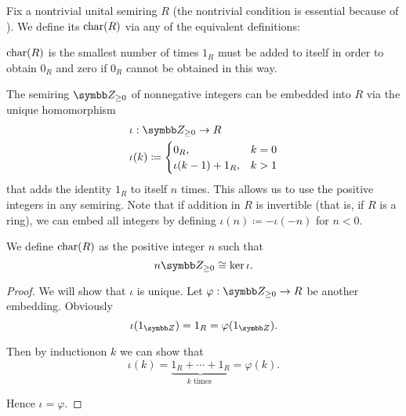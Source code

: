 \begin{definition}\label{def:semiring_characteristic}
  Fix a nontrivial unital semiring \( R \) (the nontrivial condition is essential because of ). We define its  \( \operatorname{char}(R) \) via any of the equivalent definitions:
  \begin{defenum}
     \( \operatorname{char}(R) \) is the smallest number of times \( 1_R \) must be added to itself in order to obtain \( 0_R \) and zero if \( 0_R \) cannot be obtained in this way.

     The semiring \( \BZ_{\geq 0} \) of nonnegative integers can be embedded into \( R \) via the unique homomorphism
    \begin{align*}
      &\iota: \BZ_{\geq 0} \to R \\
      &\iota(k) \coloneqq \begin{cases}
        0_R, &k = 0 \\
        \iota(k - 1) + 1_R, &k > 1
      \end{cases}
    \end{align*}
    that adds the identity \( 1_R \) to itself \( n \) times. This allows us to use the positive integers in any semiring. Note that if addition in \( R \) is invertible (that is, if \( R \) is a ring), we can embed all integers by defining \( \iota(n) \coloneqq -\iota(-n) \) for \( n < 0 \).

    We define \( \operatorname{char}(R) \) as the positive integer \( n \) such that
    \begin{equation*}
      n\BZ_{\geq 0} \cong \ker\iota.
    \end{equation*}
  \end{defenum}
\end{definition}
\begin{proof}
  We will show that \( \iota \) is unique. Let \( \varphi: \BZ_{\geq 0} \to R \) be another embedding. Obviously
  \begin{equation*}
    \iota(1_{\BZ}) = 1_R = \varphi(1_{\BZ}).
  \end{equation*}

  Then by induction\IND on \( k \) we can show that
  \begin{equation*}
    \iota(k) = \underbrace{1_R + \cdots + 1_R}_{k \text{ times }} = \varphi(k).
  \end{equation*}

  Hence \( \iota = \varphi \).
\end{proof}

